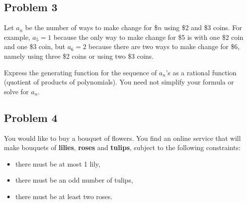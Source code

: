 \documentclass[12pt]{article}
\begin{document}
\newpage
\subsection*{Problem 3}


Let $a_{n}$ be the number of ways to make change for \$$n$ using \$2
and \$3 coins.  For example, $a_{5} = 1$ because the only way to make
change for \$5 is with one \$2 coin and one \$3 coin, but $a_{6} = 2$
because there are two ways to make change for \$6, namely using three
\$2 coins or using two \$3 coins.

Express the generating function for the sequence of $a_{n}$'s as a
rational function (quotient of products of polynomials).  You need not
simplify your formula or solve for $a_n$.








\newpage
\subsection*{Problem 4}


You would like to buy a bouquet of flowers.  You find an
online service that will make bouquets of \textbf{lilies}, \textbf{roses}
and \textbf{tulips}, subject to the following constraints:
\begin{itemize}
\item there must be at most 1 lily,
\item there must be an odd number of tulips,
\item there must be at least two roses.
\end{itemize}
\end{document}
